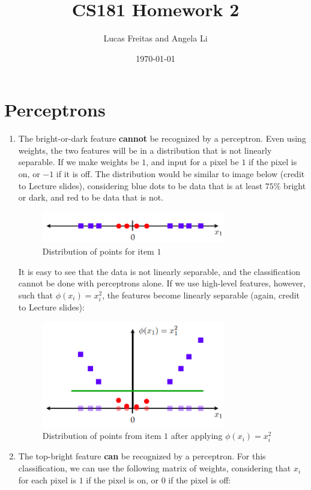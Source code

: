 \documentclass{article}
\title{CS181 Homework 2}
\author{Lucas Freitas and Angela Li}
\date{\today}
\begin{document}
\maketitle

\section{Perceptrons}

\begin{enumerate}

\item %
The bright-or-dark feature \textbf{cannot} be recognized by a perceptron. Even using weights, the two features will be in a distribution that is not linearly separable. If we make weights be $1$, and input for a pixel be $1$ if the pixel is on, or $-1$ if it is off. The distribution would be similar to image below (credit to Lecture slides), considering blue dots to be data that is at least $75\%$ bright or dark, and red to be data that is not. 

\begin{figure}[h!]
\centering
\includegraphics[width=80mm]{hw211.png}
\caption{Distribution of points for item $1$}
\end{figure}

It is easy to see that the data is not linearly separable, and the classification cannot be done with perceptrons alone. If we use high-level features, however, such that $\phi(x_i)=x_i^2$, the features become linearly separable (again, credit to Lecture slides):

\begin{figure}[h!]
\centering
\includegraphics[width=80mm]{hw2112.png}
\caption{Distribution of points from item $1$ after applying $\phi(x_i)=x_i^2$}
\end{figure}

\item %
The top-bright feature \textbf{can} be recognized by a perceptron. For this classification, we can use the following matrix of weights, considering that $x_i$ for each pixel is $1$ if the pixel is on, or $0$ if the pixel is off:


\end{enumerate}
\end{document}
